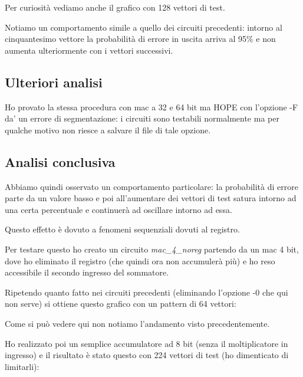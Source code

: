 \documentclass[12pt, letterpaper]{article}
\begin{document}


Per curiosità vediamo anche il grafico con 128 vettori di test.



Notiamo un comportamento simile a quello dei circuiti precedenti: intorno al cinquantesimo vettore la probabilità di errore in uscita arriva al 95\% e non aumenta ulteriormente con i vettori successivi.

\subsection{Ulteriori analisi}

Ho provato la stessa procedura con mac a 32 e 64 bit ma HOPE con l'opzione -F da' un errore di segmentazione: i circuiti sono testabili normalmente ma per qualche motivo non riesce a salvare il file di tale opzione.

\subsection{Analisi conclusiva}

Abbiamo quindi osservato un comportamento particolare: la probabilità di errore parte da un valore basso e poi all'aumentare dei vettori di test satura intorno ad una certa percentuale e continuerà ad oscillare intorno ad essa.

Questo effetto è dovuto a fenomeni sequenziali dovuti al registro.

Per testare questo ho creato un circuito \textit{mac\_4\_noreg} partendo da un mac 4 bit, dove ho eliminato il registro (che quindi ora non accumulerà più) e ho reso accessibile il secondo ingresso del sommatore.

Ripetendo quanto fatto nei circuiti precedenti (eliminando l'opzione -0 che qui non serve) si ottiene questo grafico con un pattern di 64 vettori:



Come si può vedere qui non notiamo l'andamento visto precedentemente.

Ho realizzato poi un semplice accumulatore ad 8 bit (senza il moltiplicatore in ingresso) e il risultato è stato questo con 224 vettori di test (ho dimenticato di limitarli):


\end{document}
